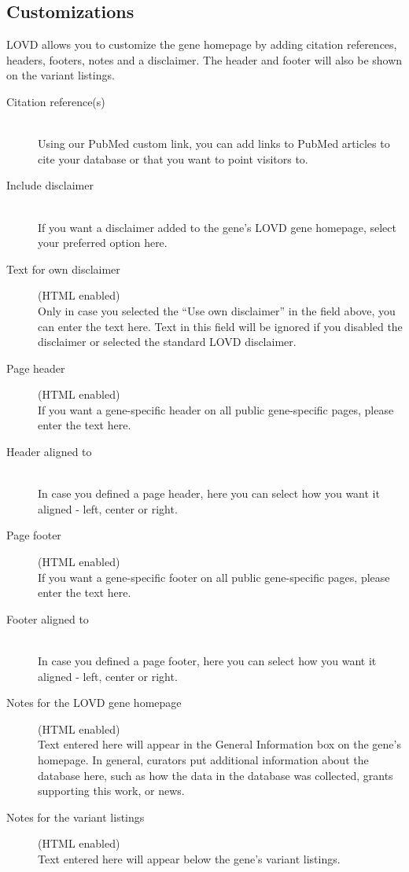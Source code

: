 \documentclass[a4paper,oneside,openany,12pt]{memoir}
\begin{document}
\subsection{Customizations}
LOVD allows you to customize the gene homepage by adding citation references, headers, footers, notes and a disclaimer.
The header and footer will also be shown on the variant listings.
\begin{description}
  \item[Citation reference(s)] \hfill \\
  Using our PubMed custom link, you can add links to PubMed articles to cite your database or that you want to point visitors to.
  \item[Include disclaimer] \hfill \\
  If you want a disclaimer added to the gene's LOVD gene homepage, select your preferred option here.
  \item[Text for own disclaimer] (HTML enabled)\hfill \\
  Only in case you selected the ``Use own disclaimer'' in the field above, you can enter the text here.
  Text in this field will be ignored if you disabled the disclaimer or selected the standard LOVD disclaimer.
  \item[Page header] (HTML enabled) \hfill \\
  If you want a gene-specific header on all public gene-specific pages, please enter the text here.
  \item[Header aligned to] \hfill \\
  In case you defined a page header, here you can select how you want it aligned - left, center or right.
  \item[Page footer] (HTML enabled) \hfill \\
  If you want a gene-specific footer on all public gene-specific pages, please enter the text here.
  \item[Footer aligned to] \hfill \\
  In case you defined a page footer, here you can select how you want it aligned - left, center or right.
  \item[Notes for the LOVD gene homepage] (HTML enabled) \hfill \\
  Text entered here will appear in the General Information box on the gene's homepage.
  In general, curators put additional information about the database here, such as how the data in the database was collected, grants supporting this work, or news.
  \item[Notes for the variant listings] (HTML enabled) \hfill \\
  Text entered here will appear below the gene's variant listings.
\end{description}
\end{document}
